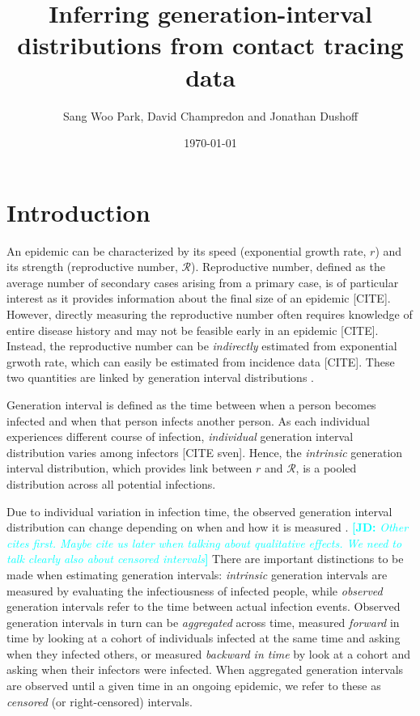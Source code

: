 \documentclass{article}
\title{Inferring generation-interval distributions from contact tracing data}
\author{Sang Woo Park, David Champredon and Jonathan Dushoff}
\date{\today}
\newcommand{\RR}{\ensuremath{{\mathcal R}}}
\newcommand{\comment}[3]{\textcolor{#1}{\textbf{[#2: }\textsl{#3}\textbf{]}}}
\newcommand{\jd}[1]{\comment{cyan}{JD}{#1}}
\begin{document}
\maketitle

\section{Introduction}

An epidemic can be characterized by its speed (exponential growth rate, $r$) and its strength (reproductive number, \RR).
Reproductive number, defined as the average number of secondary cases arising from a primary case, is of particular interest as it provides information about the final size of an epidemic [CITE].
However, directly measuring the reproductive number often requires knowledge of entire disease history and may not be feasible early in an epidemic [CITE].
Instead, the reproductive number can be \emph{indirectly} estimated from exponential grwoth rate, which can easily be estimated from incidence data [CITE].
These two quantities are linked by generation interval distributions \citep{wallinga2007generation}.

Generation interval is defined as the time between when a person becomes infected and when that person infects another person.
As each individual experiences different course of infection, \emph{individual} generation interval distribution varies among infectors [CITE sven].
Hence, the \emph{intrinsic} generation interval distribution, which provides link between $r$ and \RR, is a pooled distribution across all potential infections.

Due to individual variation in infection time, the observed generation interval distribution can change depending on when and how it is measured \citep{champredon2015intrinsic}. \jd{Other cites first. Maybe cite us later when talking about qualitative effects. We need to talk clearly also about censored intervals}
There are important distinctions to be made when estimating generation intervals: \emph{intrinsic} generation intervals are measured by evaluating the infectiousness of infected people,
while \emph{observed} generation intervals refer to the time between actual infection events.
Observed generation intervals in turn can be \emph{aggregated} across time, measured \emph{forward} in time by looking at a cohort of individuals infected at the same time and asking when they infected others, or measured \emph{backward in time} by look at a cohort and asking when their infectors were infected.
When aggregated generation intervals are observed until a given time in an ongoing epidemic, we refer to these as \emph{censored} (or right-censored) intervals.
\end{document}
